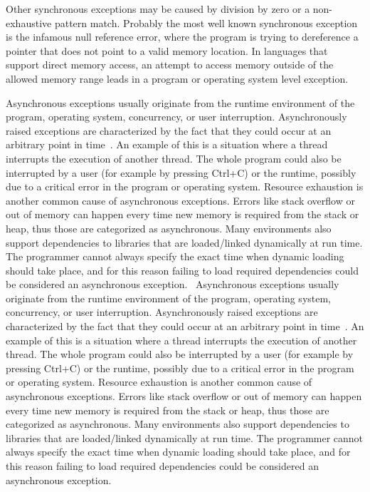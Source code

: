 Other synchronous exceptions may be caused by division by zero or a non-exhaustive pattern match. Probably the most well known synchronous exception is the infamous null reference error, where the program is trying to dereference a pointer that does not point to a valid memory location. In languages that support direct memory access, an attempt to access memory outside of the allowed memory range leads in a program or operating system level exception.~\cite{akward-squad}

Asynchronous exceptions usually originate from the runtime environment of the program, operating system, concurrency, or user interruption. Asynchronously raised exceptions are characterized by the fact that they could occur at an arbitrary point in time~\cite{async-exc}. An example of this is a situation where a thread interrupts the execution of another thread. The whole program could also be interrupted by a user (for example by pressing Ctrl+C) or the runtime, possibly due to a critical error in the program or operating system. Resource exhaustion is another common cause of asynchronous exceptions. Errors like stack overflow or out of memory can happen every time new memory is required from the stack or heap, thus those are categorized as asynchronous. Many environments also support dependencies to libraries that are loaded/linked  dynamically at run time. The programmer cannot always specify the exact time when dynamic loading should take place, and for this reason failing to load required dependencies could be considered an asynchronous exception.~\cite{akward-squad}
Asynchronous exceptions usually originate from the runtime environment of the program, operating system, concurrency, or user interruption. Asynchronously raised exceptions are characterized by the fact that they could occur at an arbitrary point in time~\cite{async-exc}. An example of this is a situation where a thread interrupts the execution of another thread. The whole program could also be interrupted by a user (for example by pressing Ctrl+C) or the runtime, possibly due to a critical error in the program or operating system. Resource exhaustion is another common cause of asynchronous exceptions. Errors like stack overflow or out of memory can happen every time new memory is required from the stack or heap, thus those are categorized as asynchronous. Many environments also support dependencies to libraries that are loaded/linked  dynamically at run time. The programmer cannot always specify the exact time when dynamic loading should take place, and for this reason failing to load required dependencies could be considered an asynchronous exception.~\cite{akward-squad}


